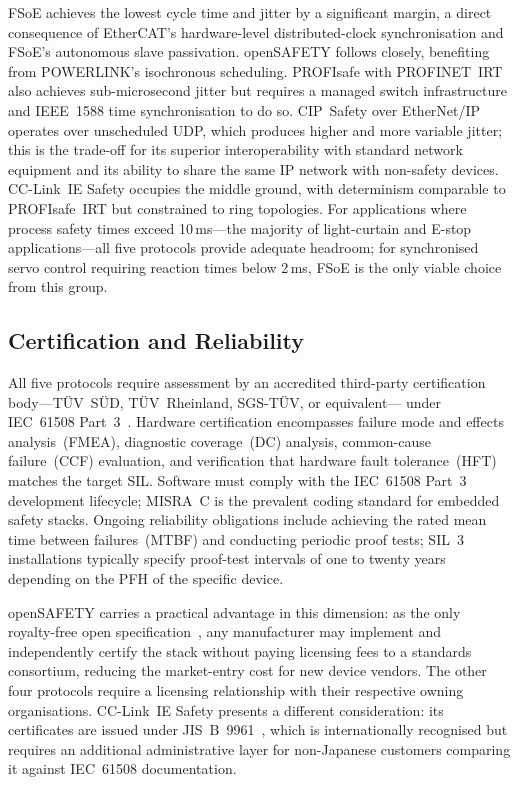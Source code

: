 \documentclass[conference]{IEEEtran}
\begin{document}
FSoE achieves the lowest cycle time and jitter by a significant margin,
a direct consequence of EtherCAT's hardware-level distributed-clock
synchronisation and FSoE's autonomous slave passivation. openSAFETY
follows closely, benefiting from POWERLINK's isochronous scheduling.
PROFIsafe with PROFINET~IRT also achieves sub-microsecond jitter but
requires a managed switch infrastructure and IEEE~1588 time
synchronisation to do so. CIP~Safety over EtherNet/IP operates over
unscheduled UDP, which produces higher and more variable jitter;
this is the trade-off for its superior interoperability with standard
network equipment and its ability to share the same IP network with
non-safety devices. CC-Link~IE Safety occupies the middle ground,
with determinism comparable to PROFIsafe~IRT but constrained to
ring topologies. For applications where process safety times exceed
10\,ms---the majority of light-curtain and E-stop applications---all five
protocols provide adequate headroom; for synchronised servo control
requiring reaction times below 2\,ms, FSoE is the only viable choice
from this group.

\subsection{Certification and Reliability}

All five protocols require assessment by an accredited third-party
certification body---TÜV~SÜD, TÜV~Rheinland, SGS-TÜV, or equivalent---
under IEC~61508 Part~3~\cite{IEC61508}. Hardware certification encompasses
failure mode and effects analysis~(FMEA), diagnostic coverage~(DC)
analysis, common-cause failure~(CCF) evaluation, and verification that
hardware fault tolerance~(HFT) matches the target SIL. Software must
comply with the IEC~61508 Part~3 development lifecycle; MISRA~C is the
prevalent coding standard for embedded safety stacks.
Ongoing reliability obligations include achieving the rated mean time
between failures~(MTBF) and conducting periodic proof tests; SIL~3
installations typically specify proof-test intervals of one to twenty years
depending on the PFH of the specific device.

openSAFETY carries a practical advantage in this dimension: as the only
royalty-free open specification~\cite{EPSGopenSAFETY}, any manufacturer
may implement and independently certify the stack without paying licensing
fees to a standards consortium, reducing the market-entry cost for new
device vendors. The other four protocols require a licensing relationship
with their respective owning organisations. CC-Link~IE Safety presents
a different consideration: its certificates are issued under
JIS~B~9961~\cite{CLPASafety}, which is internationally recognised but
requires an additional administrative layer for non-Japanese customers
comparing it against IEC~61508 documentation.
\end{document}
